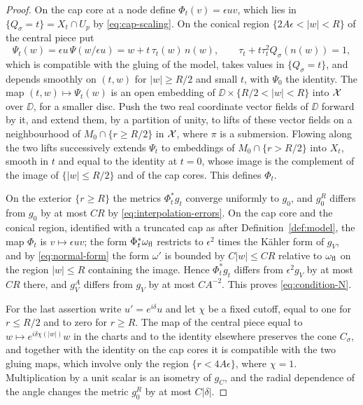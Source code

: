 \begin{proof}
On the cap core at a node define $\Phi_t(v)=\epsilon uv$, which lies in
$\{Q_\sigma=t\}=X_t\cap U_p$ by \eqref{eq:cap-scaling}. On the conical
region $\{2A\epsilon<|w|<R\}$ of the central piece put
\[
 \Psi_t(w)=\epsilon u\,\Psi(w/\epsilon u)=w+t\,\tau_t(w)\,n(w),
 \qquad\tau_t+t\tau_t^2Q_\sigma(n(w))=1 ,
\]
which is compatible with the gluing of the model, takes values in
$\{Q_\sigma=t\}$, and depends smoothly on $(t,w)$ for $|w|\ge R/2$ and
small $t$, with $\Psi_0$ the identity. The map $(t,w)\mapsto\Psi_t(w)$
is an open embedding of $\DD\times\{R/2<|w|<R\}$ into $\mathcal X$ over
$\DD$, for a smaller disc. Push the two real coordinate vector fields of
$\DD$ forward by it, and extend them, by a partition of unity, to lifts
of these vector fields on a neighbourhood of $M_0\cap\{r\ge R/2\}$ in
$\mathcal X$, where $\pi$ is a submersion. Flowing along the two lifts
successively extends $\Psi_t$ to embeddings of $M_0\cap\{r>R/2\}$ into
$X_t$, smooth in $t$ and equal to the identity at $t=0$, whose image is
the complement of the image of $\{|w|\le R/2\}$ and of the cap cores.
This defines $\Phi_t$.

On the exterior $\{r\ge R\}$ the metrics $\Phi_t^*g_t$ converge uniformly
to $g_0$, and $g_0^R$ differs from $g_0$ by at most $CR$ by
\eqref{eq:interpolation-errors}. On the cap core and the conical region, identified with a truncated
cap as after Definition~\ref{def:model}, the map $\Phi_t$ is
$v\mapsto\epsilon uv$; the form $\Phi_t^*\omega_{\rm fl}$
restricts to $\epsilon^2$ times the K\"ahler form of $g_V$, and by
\eqref{eq:normal-form} the form $\omega'$ is bounded by $C|w|\le CR$
relative to $\omega_{\rm fl}$ on the region $|w|\le R$ containing the
image. Hence $\Phi_t^*g_t$ differs from $\epsilon^2g_V$ by at most $CR$
there, and $g_V^A$ differs from $g_V$ by at most $CA^{-2}$. This proves
\eqref{eq:condition-N}.

For the last assertion write $u'=e^{i\delta}u$ and let $\chi$ be a fixed
cutoff, equal to one for $r\le R/2$ and to zero for $r\ge R$. The map of
the central piece equal to $w\mapsto e^{i\delta\chi(|w|)}w$ in the charts
and to the identity elsewhere preserves the cone $C_\sigma$, and together
with the identity on the cap cores it is compatible with the two gluing
maps, which involve only the region $\{r<4A\epsilon\}$, where $\chi=1$. Multiplication by a unit scalar is an
isometry of $g_C$, and the radial dependence of the angle changes the
metric $g_0^R$ by at most $C|\delta|$.
\end{proof}

